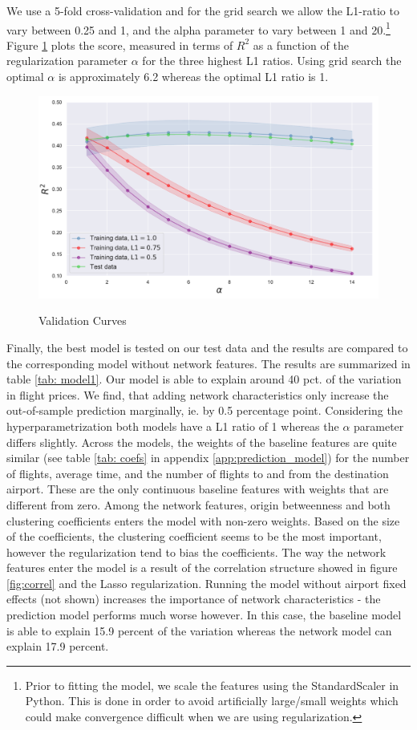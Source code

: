 We use a 5-fold cross-validation and for the grid search we allow the L1-ratio to vary between 0.25 and 1, and the alpha parameter to vary between 1 and 20.\footnote{Prior to fitting the model, we scale the features using the StandardScaler in Python. This is done in order to avoid artificially large/small weights which could make convergence difficult when we are using regularization.} 
Figure \ref{fig:validation curve} plots the score, measured in terms of $R^2$ as a function of the regularization parameter $\alpha$ for the three highest L1 ratios. Using grid search the optimal $\alpha$ is approximately 6.2 whereas the optimal L1 ratio is 1. \\ %
\begin{figure}[H]
  \centering
  \caption{Validation Curves}
    \includegraphics[width=1. \textwidth]{Exam/Figures/validation_curve.pdf}
  \label{fig:validation curve}
\end{figure}
Finally, the best model is tested on our test data and the results are compared to the corresponding model without network features. The results are summarized in table \ref{tab: model1}. Our model is able to explain around 40 pct. of the variation in flight prices. We find, that adding network characteristics only increase the out-of-sample prediction marginally, ie. by 0.5 percentage point. Considering the hyperparametrization both models have a L1 ratio of 1 whereas the $\alpha$ parameter differs slightly. Across the models, the weights of the baseline features are quite similar (see table \ref{tab: coefs} in appendix \ref{app:prediction_model}) for the number of flights, average time, and the number of flights to and from the destination airport. These are the only continuous baseline features with weights that are different from zero. Among the network  features, origin betweenness and both clustering coefficients enters the model with non-zero weights. Based on the size of the coefficients, the clustering coefficient seems to be the most important, however the regularization tend to bias the coefficients. The way the network features enter the model is a result of the correlation structure showed in figure \ref{fig:correl} and the Lasso regularization. Running the model without airport fixed effects (not shown) increases the importance of network characteristics - the prediction model performs much worse however. In this case, the baseline model is able to explain 15.9 percent of the variation whereas the network model can explain 17.9 percent. 

